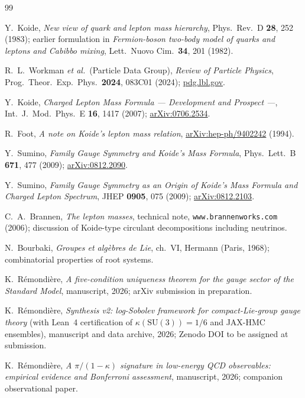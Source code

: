 \documentclass[aps,prl,reprint,amsmath,amssymb,nofootinbib,floatfix,superscriptaddress]{revtex4-2}
\newcommand{\SU}{\mathrm{SU}}
\begin{document}
\begin{thebibliography}{99}

Y.~Koide,
\emph{New view of quark and lepton mass hierarchy},
Phys.\ Rev.\ D \textbf{28}, 252 (1983);
earlier formulation in
\emph{Fermion-boson two-body model of quarks and leptons and Cabibbo mixing},
Lett.\ Nuovo Cim.\ \textbf{34}, 201 (1982).

R.~L.~Workman \emph{et al.}\ (Particle Data Group),
\emph{Review of Particle Physics},
Prog.\ Theor.\ Exp.\ Phys.\ \textbf{2024}, 083C01 (2024);
\href{https://pdg.lbl.gov}{pdg.lbl.gov}.

Y.~Koide,
\emph{Charged Lepton Mass Formula --- Development and Prospect ---},
Int.\ J.\ Mod.\ Phys.\ E \textbf{16}, 1417 (2007);
\href{https://arxiv.org/abs/0706.2534}{arXiv:0706.2534}.

R.~Foot,
\emph{A note on Koide's lepton mass relation},
\href{https://arxiv.org/abs/hep-ph/9402242}{arXiv:hep-ph/9402242} (1994).

Y.~Sumino,
\emph{Family Gauge Symmetry and Koide's Mass Formula},
Phys.\ Lett.\ B \textbf{671}, 477 (2009);
\href{https://arxiv.org/abs/0812.2090}{arXiv:0812.2090}.

Y.~Sumino,
\emph{Family Gauge Symmetry as an Origin of Koide's Mass Formula and Charged Lepton Spectrum},
JHEP \textbf{0905}, 075 (2009);
\href{https://arxiv.org/abs/0812.2103}{arXiv:0812.2103}.

C.~A.~Brannen,
\emph{The lepton masses},
technical note, \texttt{www.brannenworks.com} (2006);
discussion of Koide-type circulant decompositions including neutrinos.

N.~Bourbaki,
\emph{Groupes et alg\`ebres de Lie}, ch.~VI,
Hermann (Paris, 1968);
combinatorial properties of root systems.

K.~R\'emondi\`ere,
\emph{A five-condition uniqueness theorem for the gauge sector of the Standard Model},
manuscript, 2026; arXiv submission in preparation.

K.~R\'emondi\`ere,
\emph{Synthesis v2: log-Sobolev framework for compact-Lie-group gauge theory}
(with Lean~4 certification of $\kappa(\SU(3)) = 1/6$ and JAX-HMC ensembles),
manuscript and data archive, 2026;
Zenodo DOI to be assigned at submission.

K.~R\'emondi\`ere,
\emph{A $\pi/(1{-}\kappa)$ signature in low-energy QCD observables: empirical evidence and Bonferroni assessment},
manuscript, 2026;
companion observational paper.


\end{thebibliography}
\end{document}
